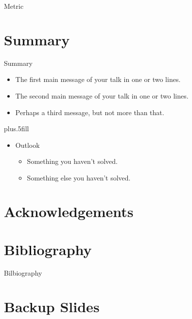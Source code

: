 \documentclass[usenames,dvipsnames]{beamer}
\begin{document}
\begin{frame}{Metric}
\begin{table}

\end{table}
\end{frame}

\section*{Summary}

\begin{frame}{Summary}
  \begin{itemize}
  \item
    The \alert{first main message} of your talk in one or two lines.
  \item
    The \alert{second main message} of your talk in one or two lines.
  \item
    Perhaps a \alert{third message}, but not more than that.
  \end{itemize}
  
  \vskip0pt plus.5fill
  \begin{itemize}
  \item
    Outlook
    \begin{itemize}
    \item
      Something you haven't solved.
    \item
      Something else you haven't solved.
    \end{itemize}
  \end{itemize}
\end{frame}


\appendix

\section{Acknowledgements}

\section{Bibliography}

\begin{frame}[allowframebreaks]{Bilbiography}
  
  
\end{frame}

\section{Backup Slides}

\begin{frame}
\end{frame}
\end{document}
